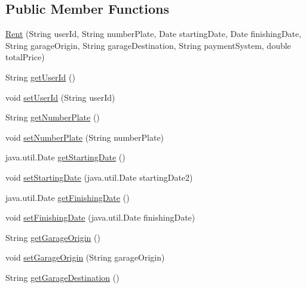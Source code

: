 \subsection*{Public Member Functions}
\begin{DoxyCompactItemize}
\item 
\mbox{\hyperlink{classcarrenting_1_1server_1_1jdo_1_1_rent_ad9020a4971425f47e303fb3436f516fb}{Rent}} (String user\+Id, String number\+Plate, Date starting\+Date, Date finishing\+Date, String garage\+Origin, String garage\+Destination, String payment\+System, double total\+Price)
\item 
String \mbox{\hyperlink{classcarrenting_1_1server_1_1jdo_1_1_rent_ac08fdfb15d1916dc2b124cda2c38f412}{get\+User\+Id}} ()
\item 
void \mbox{\hyperlink{classcarrenting_1_1server_1_1jdo_1_1_rent_aa8754262fbafe71067360b137ea41335}{set\+User\+Id}} (String user\+Id)
\item 
String \mbox{\hyperlink{classcarrenting_1_1server_1_1jdo_1_1_rent_a91e5c7e50a1ad550e9bf5b106cd5d7fa}{get\+Number\+Plate}} ()
\item 
void \mbox{\hyperlink{classcarrenting_1_1server_1_1jdo_1_1_rent_a99b32d65aba5e0a5fb82714f009da697}{set\+Number\+Plate}} (String number\+Plate)
\item 
java.\+util.\+Date \mbox{\hyperlink{classcarrenting_1_1server_1_1jdo_1_1_rent_a8c473af7dfbd02277e8993a984ba8e98}{get\+Starting\+Date}} ()
\item 
void \mbox{\hyperlink{classcarrenting_1_1server_1_1jdo_1_1_rent_ab129f961def3e52b44f9b0b9345358b6}{set\+Starting\+Date}} (java.\+util.\+Date starting\+Date2)
\item 
java.\+util.\+Date \mbox{\hyperlink{classcarrenting_1_1server_1_1jdo_1_1_rent_a0f93847b1fbcebcbf6c39dd0d539bf00}{get\+Finishing\+Date}} ()
\item 
void \mbox{\hyperlink{classcarrenting_1_1server_1_1jdo_1_1_rent_a01b235a37dc6025d28299df4ad31f2d7}{set\+Finishing\+Date}} (java.\+util.\+Date finishing\+Date)
\item 
String \mbox{\hyperlink{classcarrenting_1_1server_1_1jdo_1_1_rent_a2ec000cdd1156e64c50277541ad95f6a}{get\+Garage\+Origin}} ()
\item 
void \mbox{\hyperlink{classcarrenting_1_1server_1_1jdo_1_1_rent_a526a9355e25db6101e214734242c5012}{set\+Garage\+Origin}} (String garage\+Origin)
\item 
String \mbox{\hyperlink{classcarrenting_1_1server_1_1jdo_1_1_rent_a977c1c0516e78d672da939d76b3a28c9}{get\+Garage\+Destination}} ()

\end{DoxyCompactItemize}
